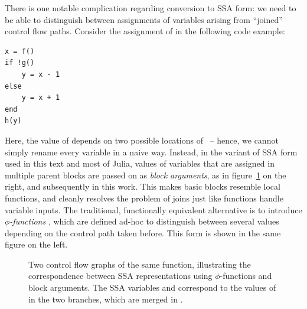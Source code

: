 There is one notable complication regarding conversion to SSA form: we need to be able to
distinguish between assignments of variables arising from \enquote{joined} control flow paths.
Consider the assignment of  in the following code example:
\begin{lstlisting}
x = f()
if !g()
    y = x - 1
else
    y = x + 1
end
h(y)
\end{lstlisting}
Here, the value of  depends on two possible locations of ~-- hence, we cannot
simply rename every variable in a naive way.  Instead, in the variant of SSA form used in this text
and most of Julia, values of variables that are assigned in multiple parent blocks are passed on as
\emph{block arguments}, as in figure~\ref{fig:ssa-phi} on the right, and subsequently in this work.
This makes basic blocks resemble local functions, and cleanly resolves the problem of joins just
like functions handle variable inputs.  The traditional, functionally equivalent alternative is to
introduce \emph{\(\phi\)-functions} \parencite{rosen1988global}, which are defined ad-hoc to
distinguish between several values depending on the control path taken before.  This form is shown
in the same figure on the left.

\begin{figure}[t]
  \centering
  \hfill
  \hfill
  \hfill\null
  \caption{Two control flow graphs of the same function, illustrating the correspondence between SSA
    representations using \(\phi\)-functions and block arguments.  The SSA variables
    \protect{} and \protect{} correspond to the values of \protect{} in the
    two branches, which are merged in \protect{}.}
  \label{fig:ssa-phi}
\end{figure}

